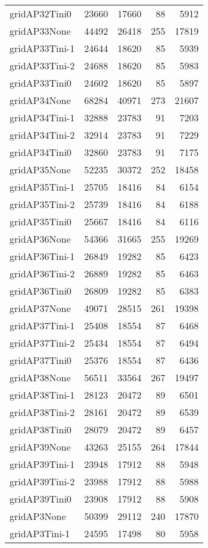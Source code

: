 \begin{longtable}{lrrrr}
gridAP32Tini0 & 23660 & 17660 & 88 & 5912 \\
gridAP33None & 44492 & 26418 & 255 & 17819 \\
gridAP33Tini-1 & 24644 & 18620 & 85 & 5939 \\
gridAP33Tini-2 & 24688 & 18620 & 85 & 5983 \\
gridAP33Tini0 & 24602 & 18620 & 85 & 5897 \\
gridAP34None & 68284 & 40971 & 273 & 21607 \\
gridAP34Tini-1 & 32888 & 23783 & 91 & 7203 \\
gridAP34Tini-2 & 32914 & 23783 & 91 & 7229 \\
gridAP34Tini0 & 32860 & 23783 & 91 & 7175 \\
gridAP35None & 52235 & 30372 & 252 & 18458 \\
gridAP35Tini-1 & 25705 & 18416 & 84 & 6154 \\
gridAP35Tini-2 & 25739 & 18416 & 84 & 6188 \\
gridAP35Tini0 & 25667 & 18416 & 84 & 6116 \\
gridAP36None & 54366 & 31665 & 255 & 19269 \\
gridAP36Tini-1 & 26849 & 19282 & 85 & 6423 \\
gridAP36Tini-2 & 26889 & 19282 & 85 & 6463 \\
gridAP36Tini0 & 26809 & 19282 & 85 & 6383 \\
gridAP37None & 49071 & 28515 & 261 & 19398 \\
gridAP37Tini-1 & 25408 & 18554 & 87 & 6468 \\
gridAP37Tini-2 & 25434 & 18554 & 87 & 6494 \\
gridAP37Tini0 & 25376 & 18554 & 87 & 6436 \\
gridAP38None & 56511 & 33564 & 267 & 19497 \\
gridAP38Tini-1 & 28123 & 20472 & 89 & 6501 \\
gridAP38Tini-2 & 28161 & 20472 & 89 & 6539 \\
gridAP38Tini0 & 28079 & 20472 & 89 & 6457 \\
gridAP39None & 43263 & 25155 & 264 & 17844 \\
gridAP39Tini-1 & 23948 & 17912 & 88 & 5948 \\
gridAP39Tini-2 & 23988 & 17912 & 88 & 5988 \\
gridAP39Tini0 & 23908 & 17912 & 88 & 5908 \\
gridAP3None & 50399 & 29112 & 240 & 17870 \\
gridAP3Tini-1 & 24595 & 17498 & 80 & 5958 \\

\end{longtable}
